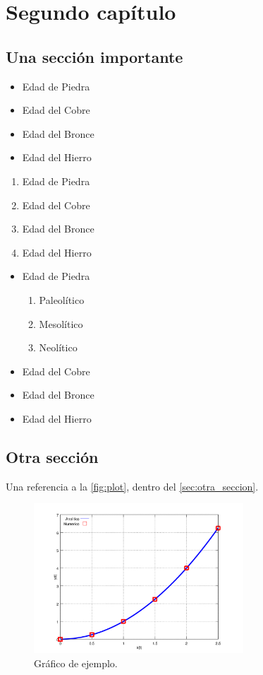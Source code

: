 
\chapter{Segundo capítulo}

\section{Una sección importante}

\begin{itemize}
	\item Edad de Piedra
	\item Edad del Cobre
	\item Edad del Bronce
	\item Edad del Hierro
\end{itemize}

\begin{enumerate}
	\item Edad de Piedra
	\item Edad del Cobre
	\item Edad del Bronce
	\item Edad del Hierro
\end{enumerate}

\begin{itemize}
	\item Edad de Piedra
	\begin{enumerate}
		\item Paleolítico
		\item Mesolítico
		\item Neolítico
	\end{enumerate}
	\item Edad del Cobre
	\item Edad del Bronce
	\item Edad del Hierro
\end{itemize}
\newpage
\section{Otra sección} \label{sec:otra_seccion}

Una referencia a la \autoref{fig:plot}, dentro del \autoref{sec:otra_seccion}.

\begin{figure}[h]
	\centering
	\includegraphics[width=0.7\textwidth]{Figuras/capitulo_2/x_vs_y}
	\caption{Gráfico de ejemplo.}
	\label{fig:plot}
\end{figure}

